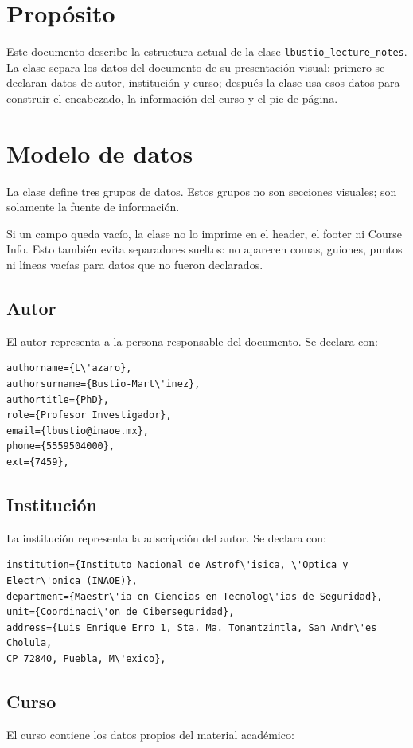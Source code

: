 \documentclass[
  coursetitle={Manual de uso de \texttt{lbustio\_lecture\_notes}},
  coursehours={96},
  coursedate={Verano 2026},
  doctype={Documentaci\'on de la clase},
  otherlangs={english,french},
  authorname={L\'azaro},
  authorsurname={Bustio-Mart\'inez},
  authortitle={PhD},
  role={Profesor Investigador},
  email={lbustio@inaoe.mx},
  phone={5559504000},
  ext={7459},
  institution={Instituto Nacional de Astrof\'isica, \'Optica y Electr\'onica (INAOE)},
  department={Maestr\'ia en Ciencias en Tecnolog\'ias de Seguridad},
  unit={Coordinaci\'on de Ciberseguridad},
  address={Luis Enrique Erro 1, Sta. Ma. Tonantzintla, San Andr\'es Cholula, CP 72840, Puebla, M\'exico},
  margin={0.5in}
]{lbustio_lecture_notes}
\begin{document}
\IberoCourseInfo

\section{Prop\'osito}
Este documento describe la estructura actual de la clase \texttt{lbustio\_lecture\_notes}. La clase separa los datos del documento de su presentaci\'on visual: primero se declaran datos de autor, instituci\'on y curso; despu\'es la clase usa esos datos para construir el encabezado, la informaci\'on del curso y el pie de p\'agina.

\section{Modelo de datos}
La clase define tres grupos de datos. Estos grupos no son secciones visuales; son solamente la fuente de informaci\'on.

Si un campo queda vac\'io, la clase no lo imprime en el header, el footer ni Course Info. Esto tambi\'en evita separadores sueltos: no aparecen comas, guiones, puntos ni l\'ineas vac\'ias para datos que no fueron declarados.

\subsection{Autor}
El autor representa a la persona responsable del documento. Se declara con:

\begin{verbatim}
authorname={L\'azaro},
authorsurname={Bustio-Mart\'inez},
authortitle={PhD},
role={Profesor Investigador},
email={lbustio@inaoe.mx},
phone={5559504000},
ext={7459},
\end{verbatim}

\subsection{Instituci\'on}
La instituci\'on representa la adscripci\'on del autor. Se declara con:

\begin{verbatim}
institution={Instituto Nacional de Astrof\'isica, \'Optica y Electr\'onica (INAOE)},
department={Maestr\'ia en Ciencias en Tecnolog\'ias de Seguridad},
unit={Coordinaci\'on de Ciberseguridad},
address={Luis Enrique Erro 1, Sta. Ma. Tonantzintla, San Andr\'es Cholula,
CP 72840, Puebla, M\'exico},
\end{verbatim}

\subsection{Curso}
El curso contiene los datos propios del material acad\'emico:
\end{document}
